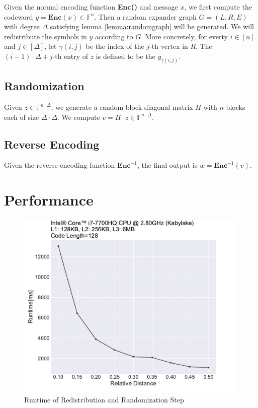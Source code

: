 Given the normal encoding function \textbf{Enc()} and message $x$, we first compute the codeword $y = \textbf{Enc}(x) \in \mathbb{F}^n$. Then a random expander graph $G = (L, R, E)$ with degree $\Delta$ satisfying lemma \ref{lemma:randomgraph} will be generated. We will redistribute the symbols in $y$ according to $G$. More concretely, for everty $i \in [n]$ and $j \in [\Delta]$, let $\gamma(i, j)$ be the index of the $j$-th vertex in $R$. The $(i - 1) \cdot \Delta + j$-th entry of $z$ is defined to be the $y_{\gamma(i, j)}$.

\subsection{Randomization}

Given $z \in \mathbb{F}^{n \cdot \Delta}$, we generate a random block diagonal matrix $H$ with $n$ blocks each of size $\Delta \cdot \Delta$. We compute $v = H \cdot z \in \mathbb{F}^{n \cdot \Delta}$.

\subsection{Reverse Encoding}

Given the reverse encoding function $\textbf{Enc}^{-1}$, the final output is $w = \textbf{Enc}^{-1}(v)$.

\section{Performance}

\begin{figure}[h]
    \centering
    \includegraphics[width=1\textwidth]{graph/degree.pdf}
    \caption{Runtime of Redistribution and Randomization Step}
    \label{fig:degree}
\end{figure}


